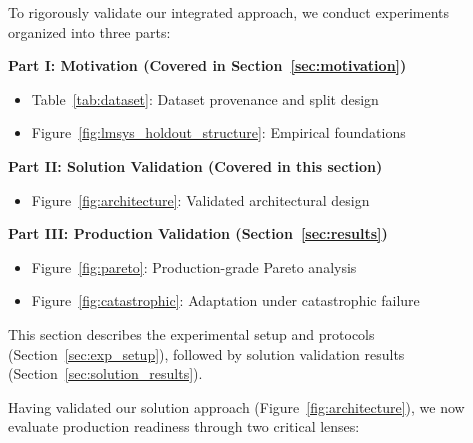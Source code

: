 
To rigorously validate our integrated approach, we conduct experiments organized into three parts:

\textbf{Part I: Motivation (Covered in Section~\ref{sec:motivation})}
\begin{itemize}
    \item Table~\ref{tab:dataset}: Dataset provenance and split design
    \item Figure~\ref{fig:lmsys_holdout_structure}: Empirical foundations
\end{itemize}

\textbf{Part II: Solution Validation (Covered in this section)}
\begin{itemize}
    \item Figure~\ref{fig:architecture}: Validated architectural design
\end{itemize}

\textbf{Part III: Production Validation (Section~\ref{sec:results})}
\begin{itemize}
    \item Figure~\ref{fig:pareto}: Production-grade Pareto analysis
    \item Figure~\ref{fig:catastrophic}: Adaptation under catastrophic failure
\end{itemize}

This section describes the experimental setup and protocols (Section~\ref{sec:exp_setup}), followed by solution validation results (Section~\ref{sec:solution_results}).


Having validated our solution approach (Figure~\ref{fig:architecture}), we now evaluate production readiness through two critical lenses:

